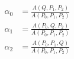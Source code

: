 \documentclass[border=6pt]{standalone}
\begin{document}
\color{white}
\(\displaystyle
\begin{aligned}
\alpha_0 &= \frac{A(Q,P_1,P_2)}{A(P_0,P_1,P_2)} \\
\alpha_1 &= \frac{A(P_0,Q,P_2)}{A(P_0,P_1,P_2)} \\
\alpha_2 &= \frac{A(P_0,P_1,Q)}{A(P_0,P_1,P_2)}
\end{aligned}
\)
\end{document}
